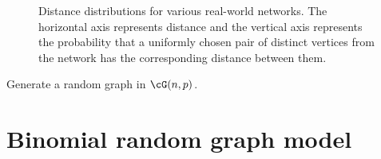 \begin{figure}[!htbp]
{}
\qquad
{}
\caption{Distance distributions for various real-world networks. The
  horizontal axis represents distance and the vertical axis represents
  the probability that a uniformly chosen pair of distinct vertices
  from the network has the corresponding distance between them.}
\label{fig:random_graphs:distance_distribution}
\end{figure}


\begin{algorithm}[!htbp]

\caption{Generate a random graph in $\cG(n,p)$.}
\label{alg:random_graphs:generate_random_Gnp}
\end{algorithm}



\section{Binomial random graph model}

